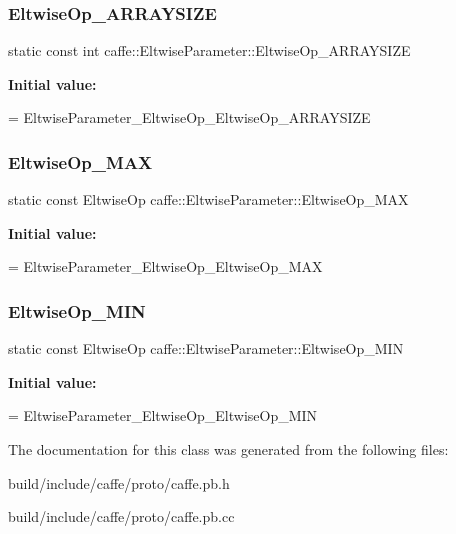 \subsubsection{\texorpdfstring{Eltwise\+Op\+\_\+\+A\+R\+R\+A\+Y\+S\+I\+ZE}{EltwiseOp\_ARRAYSIZE}}
{\footnotesize\ttfamily static const int caffe\+::\+Eltwise\+Parameter\+::\+Eltwise\+Op\+\_\+\+A\+R\+R\+A\+Y\+S\+I\+ZE\hspace{0.3cm}{\ttfamily [static]}}

{\bfseries Initial value\+:}
\begin{DoxyCode}
=
    EltwiseParameter\_EltwiseOp\_EltwiseOp\_ARRAYSIZE
\end{DoxyCode}
\mbox{\label{classcaffe_1_1_eltwise_parameter_adc847fa768d82be7f74dfc117dbe73ae}} 
\subsubsection{\texorpdfstring{Eltwise\+Op\+\_\+\+M\+AX}{EltwiseOp\_MAX}}
{\footnotesize\ttfamily static const Eltwise\+Op caffe\+::\+Eltwise\+Parameter\+::\+Eltwise\+Op\+\_\+\+M\+AX\hspace{0.3cm}{\ttfamily [static]}}

{\bfseries Initial value\+:}
\begin{DoxyCode}
=
    EltwiseParameter\_EltwiseOp\_EltwiseOp\_MAX
\end{DoxyCode}
\mbox{\label{classcaffe_1_1_eltwise_parameter_a24f7d57ee6a4c1e98af96c0710c939c6}} 
\subsubsection{\texorpdfstring{Eltwise\+Op\+\_\+\+M\+IN}{EltwiseOp\_MIN}}
{\footnotesize\ttfamily static const Eltwise\+Op caffe\+::\+Eltwise\+Parameter\+::\+Eltwise\+Op\+\_\+\+M\+IN\hspace{0.3cm}{\ttfamily [static]}}

{\bfseries Initial value\+:}
\begin{DoxyCode}
=
    EltwiseParameter\_EltwiseOp\_EltwiseOp\_MIN
\end{DoxyCode}


The documentation for this class was generated from the following files\+:\begin{DoxyCompactItemize}
\item 
build/include/caffe/proto/caffe.\+pb.\+h\item 
build/include/caffe/proto/caffe.\+pb.\+cc\end{DoxyCompactItemize}
